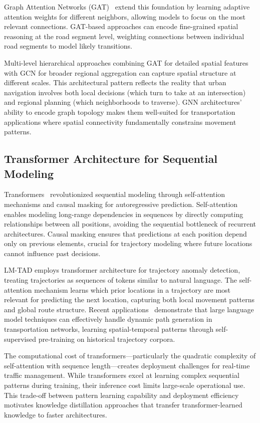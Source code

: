 Graph Attention Networks (GAT)~\cite{velickovicGraphAttentionNetworks2018} extend this foundation by learning adaptive attention weights for different neighbors, allowing models to focus on the most relevant connections. GAT-based approaches can encode fine-grained spatial reasoning at the road segment level, weighting connections between individual road segments to model likely transitions.

Multi-level hierarchical approaches combining GAT for detailed spatial features with GCN for broader regional aggregation can capture spatial structure at different scales. This architectural pattern reflects the reality that urban navigation involves both local decisions (which turn to take at an intersection) and regional planning (which neighborhoods to traverse). GNN architectures' ability to encode graph topology makes them well-suited for transportation applications where spatial connectivity fundamentally constrains movement patterns.

\subsection{Transformer Architecture for Sequential Modeling}
\label{sec:lit-transformer}

Transformers~\cite{vaswaniAttentionAllYou2023} revolutionized sequential modeling through self-attention mechanisms and causal masking for autoregressive prediction. Self-attention enables modeling long-range dependencies in sequences by directly computing relationships between all positions, avoiding the sequential bottleneck of recurrent architectures. Causal masking ensures that predictions at each position depend only on previous elements, crucial for trajectory modeling where future locations cannot influence past decisions.

LM-TAD employs transformer architecture for trajectory anomaly detection, treating trajectories as sequences of tokens similar to natural language. The self-attention mechanism learns which prior locations in a trajectory are most relevant for predicting the next location, capturing both local movement patterns and global route structure. Recent applications~\cite{liPathGenLLMLargeLanguage} demonstrate that large language model techniques can effectively handle dynamic path generation in transportation networks, learning spatial-temporal patterns through self-supervised pre-training on historical trajectory corpora.

The computational cost of transformers—particularly the quadratic complexity of self-attention with sequence length—creates deployment challenges for real-time traffic management. While transformers excel at learning complex sequential patterns during training, their inference cost limits large-scale operational use. This trade-off between pattern learning capability and deployment efficiency motivates knowledge distillation approaches that transfer transformer-learned knowledge to faster architectures.

